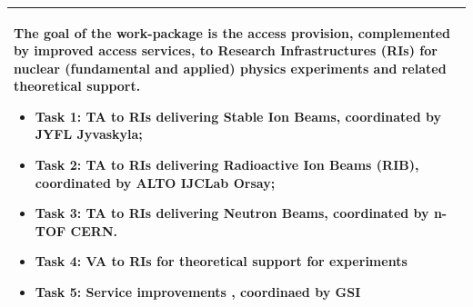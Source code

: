 \begin{table}[H]
\begin{tabular}{|p{}|}
        \hline
        \rowcolor{white} 
        \hspace*{-0.75cm} 
        \begin{minipage}[t]{\textwidth}
        {\leftskip=15pt
        The goal of the work-package is the access provision, complemented by improved access services, to Research Infrastructures (RIs) for nuclear (fundamental and applied) physics experiments and related theoretical support.
    		\begin{itemize}
    		    \item Task 1: TA to RIs delivering Stable Ion Beams, coordinated by JYFL Jyvaskyla;
    			\item Task 2: TA to RIs delivering Radioactive Ion Beams (RIB), coordinated by ALTO IJCLab Orsay;
			    \item Task 3: TA to RIs delivering Neutron Beams, coordinated by n-TOF CERN.
                    \item Task 4: VA to RIs for theoretical support for experiments 
                    \item Task 5: Service improvements , coordinaed by GSI
    		\end{itemize} 
    		\vspace*{0.10em}
            }
		\end{minipage}        
        \\
        \hline
    \end{tabular}
    \vspace{0.5em}\vfill
\end{table}

